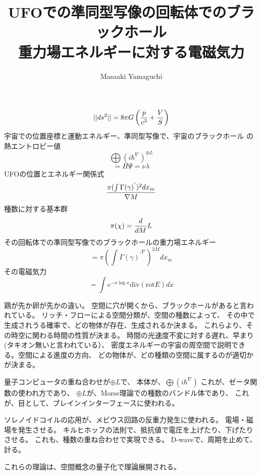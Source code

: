 \documentclass{jsarticle}
\begin{document}
\title{UFOでの準同型写像の回転体でのブラックホール \\
重力場エネルギーに対する電磁気力}
\author{Masaaki Yamaguchi}
\date{}
\maketitle

  $$ ||ds^2|| = 8 \pi G\left({{p \over c^3} + {V \over S}}\right) $$
  宇宙での位置座標と運動エネルギー、準同型写像で、宇宙のブラックホール
  の熱エントロピー値
  $$ \bigoplus {(i \hbar^{\nabla})}^{\oplus L} $$
  $$ = H \Psi = \nu \lambda $$
  UFOの位置とエネルギー関係式
  $$ {\pi{{(\int \Gamma(\gamma)^{'})^2}dx_m} \over \nabla M} $$
  種数に対する基本群
  $$ \pi(\chi) = {d \over dM}L$$
  その回転体での準同型写像でのブラックホールの重力場エネルギー
  $$ = {\pi{(\int {{\Gamma(\gamma)^{'}}}^{\nabla})}}^{2M}dx_m $$
  その電磁気力
  $$ = \int e^{-x \log x}\mathrm{div}(\mathrm{rot} E)dx $$
    
  鶏が先か卵が先かの違い。
  空間に穴が開くから、ブラックホールがあると言われている。
  リッチ・フローによる空間分類が、空間の種数によって、
  その中で生成されうる確率で、どの物体が存在、生成されるか決まる。
  これらより、その時空に関わる時間の性質が決まる。
  時間の光速度不変に対する遅れ、早まり(タキオン無いと言われている）、
  密度エネルギーの宇宙の周空間で説明できる。空間による進度の方向、
  どの物体が、どの種類の空間に属するのが適切かが決まる。

  量子コンピュータの重ね合わせが$\oplus L$で、
  本体が、$\bigoplus(i\hbar^{\nabla})$
  これが、ゼータ関数の使われ方であり、
  $\oplus L$が、Morse理論での種数のバンドル体であり、
  これが、目として、ブレインインターフェースに使われる。

  ソレノイドコイルの応用が、メビウス回路の反重力発生に使われる。
  電場・磁場を発生させる。
  キルヒホッフの法則で、抵抗値で電圧を上げたり、下げたりさせる。
  これも、種数の重ね合わせで実現できる。
  D-waveで、周期を止めて、計る。

  これらの理論は、空間概念の量子化で理論展開される。
\end{document}

